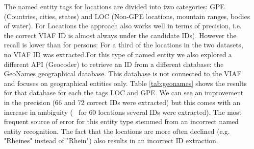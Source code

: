 \documentclass{article}
\begin{document}
The named entity tags for locations are divided into two categories: GPE (Countries, cities, states) and LOC (Non-GPE locations, mountain ranges, bodies of water). For Locations the approach also works well in terms of precision, i.e. the correct VIAF ID is almost always under the candidate IDs). However the recall is lower than for persons: For a third of the locations in the two datasets, no VIAF ID was extracted.For this type of named entity we also explored a different API (Geocoder) to retrieve an ID from a different database: the GeoNames geographical database. This database is not connected to the VIAF and focuses on geographical entities only.  Table \ref{tab:geonames} shows the results for that database for each the tags LOC and GPE. We can see an improvement in the precision (66 and 72 correct IDs were extracted) but this comes with an increase in ambiguity (~ for 60 locations several IDs were extracted). The most frequent source of error for this entity type stemmed from an incorrect named entity recognition. The fact that the locations are more often declined (e.g. "Rheines" instead of "Rhein") also results in an incorrect ID extraction.
\end{document}
